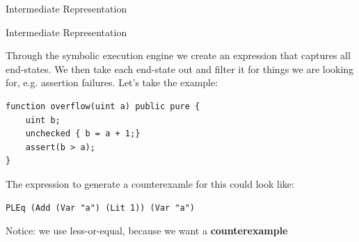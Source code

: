 \documentclass[aspectratio=169]{beamer}
\begin{document}
\begin{frame}[fragile]{Intermediate Representation}

\end{frame}

\begin{frame}[fragile=singleslide]{Intermediate Representation}
\small

Through the symbolic execution engine we create an expression that captures all end-states. We then take each end-state out and filter it for things we are looking for, e.g. assertion failures. Let's take the example:


\begin{Verbatim}[frame=single, framerule=0.2mm,framesep=2mm,fontsize=\small]
function overflow(uint a) public pure {
	uint b;
	unchecked { b = a + 1;}
	assert(b > a);
}
\end{Verbatim}

The expression to generate a counterexamle for this could look like:

\begin{Verbatim}[frame=single, framerule=0.2mm, framesep=2mm,fontsize=\small]
PLEq (Add (Var "a") (Lit 1)) (Var "a")
\end{Verbatim}

Notice: we use less-or-equal, because we want a \textbf{counterexample}
\end{frame}
\end{document}
